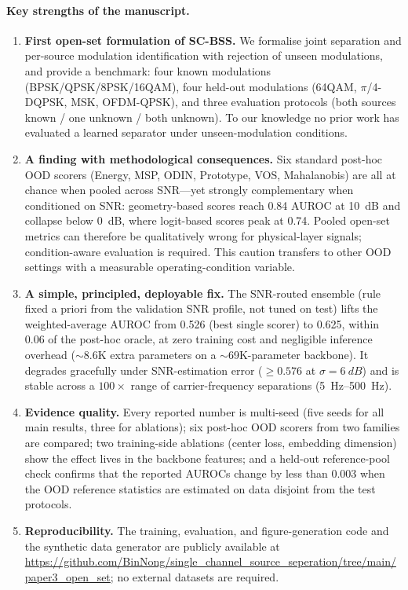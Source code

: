 \documentclass[11pt,a4paper]{article}
\begin{document}
\paragraph{Key strengths of the manuscript.}
\begin{enumerate}
\item \textbf{First open-set formulation of SC-BSS.} We formalise joint separation and per-source modulation identification with rejection of unseen modulations, and provide a benchmark: four known modulations (BPSK/QPSK/8PSK/16QAM), four held-out modulations (64QAM, $\pi$/4-DQPSK, MSK, OFDM-QPSK), and three evaluation protocols (both sources known / one unknown / both unknown). To our knowledge no prior work has evaluated a learned separator under unseen-modulation conditions.
\item \textbf{A finding with methodological consequences.} Six standard post-hoc OOD scorers (Energy, MSP, ODIN, Prototype, VOS, Mahalanobis) are all at chance when pooled across SNR---yet strongly complementary when conditioned on SNR: geometry-based scores reach 0.84 AUROC at \SI{10}{dB} and collapse below \SI{0}{dB}, where logit-based scores peak at 0.74. Pooled open-set metrics can therefore be qualitatively wrong for physical-layer signals; condition-aware evaluation is required. This caution transfers to other OOD settings with a measurable operating-condition variable.
\item \textbf{A simple, principled, deployable fix.} The SNR-routed ensemble (rule fixed a priori from the validation SNR profile, not tuned on test) lifts the weighted-average AUROC from 0.526 (best single scorer) to 0.625, within 0.06 of the post-hoc oracle, at zero training cost and negligible inference overhead ($\sim$8.6K extra parameters on a $\sim$69K-parameter backbone). It degrades gracefully under SNR-estimation error ($\geq 0.576$ at $\sigma = \SI{6}{dB}$) and is stable across a $100\times$ range of carrier-frequency separations (\SI{5}{Hz}--\SI{500}{Hz}).
\item \textbf{Evidence quality.} Every reported number is multi-seed (five seeds for all main results, three for ablations); six post-hoc OOD scorers from two families are compared; two training-side ablations (center loss, embedding dimension) show the effect lives in the backbone features; and a held-out reference-pool check confirms that the reported AUROCs change by less than 0.003 when the OOD reference statistics are estimated on data disjoint from the test protocols.
\item \textbf{Reproducibility.} The training, evaluation, and figure-generation code and the synthetic data generator are publicly available at \url{https://github.com/BinNong/single_channel_source_seperation/tree/main/paper3_open_set}; no external datasets are required.
\end{enumerate}
\end{document}
